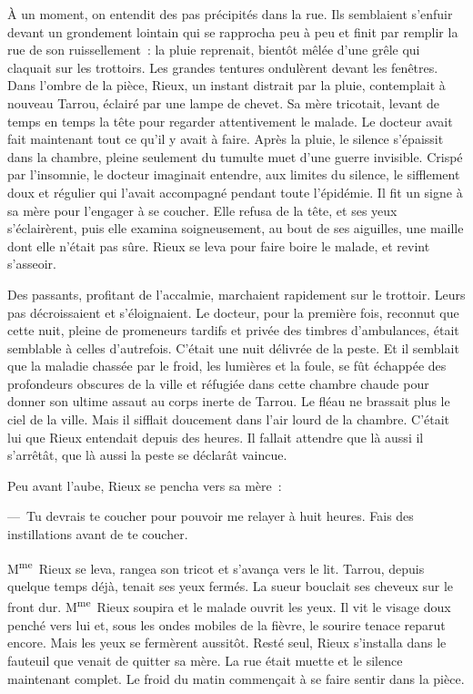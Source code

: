 \documentclass[french,twoside]{book} %
\begin{document}
À un moment, on entendit des pas précipités dans la rue. Ils semblaient s’enfuir devant un grondement lointain qui se rapprocha peu à peu et finit par remplir la rue de son ruissellement : la pluie reprenait, bientôt mêlée d’une grêle qui claquait sur les trottoirs. Les grandes tentures ondulèrent devant les fenêtres. Dans l’ombre de la pièce, Rieux, un instant distrait par la pluie, contemplait à nouveau Tarrou, éclairé par une lampe de chevet. Sa mère tricotait, levant de temps en temps la tête pour regarder attentivement le malade. Le docteur avait fait maintenant tout ce qu’il y avait à faire. Après la pluie, le silence s’épaissit dans la chambre, pleine seulement du tumulte muet d’une guerre invisible. Crispé par l’insomnie, le docteur imaginait entendre, aux limites du silence, le sifflement doux et régulier qui l’avait accompagné pendant toute l’épidémie. Il fit un signe à sa mère pour l’engager à se coucher. Elle refusa de la tête, et ses yeux s’éclairèrent, puis elle examina soigneusement, au bout de ses aiguilles, une maille dont elle n’était pas sûre. Rieux se leva pour faire boire le malade, et revint s’asseoir.\par
Des passants, profitant de l’accalmie, marchaient rapidement sur le trottoir. Leurs pas décroissaient et s’éloignaient. Le docteur, pour la première fois, reconnut que cette nuit, pleine de promeneurs tardifs et privée des timbres d’ambulances, était semblable à celles d’autrefois. C’était une nuit délivrée de la peste. Et il semblait que la maladie chassée par le froid, les lumières et la foule, se fût échappée des profondeurs obscures de la ville et réfugiée dans cette chambre chaude pour donner son ultime assaut au corps inerte de Tarrou. Le fléau ne brassait plus le ciel de la ville. Mais il sifflait doucement dans l’air lourd de la chambre. C’était lui que Rieux entendait depuis des heures. Il fallait attendre que là aussi il s’arrêtât, que là aussi la peste se déclarât vaincue.\par
Peu avant l’aube, Rieux se pencha vers sa mère :\par
— Tu devrais te coucher pour pouvoir me relayer à huit heures. Fais des instillations avant de te coucher.\par
M\textsuperscript{me} Rieux se leva, rangea son tricot et s’avança vers le lit. Tarrou, depuis quelque temps déjà, tenait ses yeux fermés. La sueur bouclait ses cheveux sur le front dur. M\textsuperscript{me} Rieux soupira et le malade ouvrit les yeux. Il vit le visage doux penché vers lui et, sous les ondes mobiles de la fièvre, le sourire tenace reparut encore. Mais les yeux se fermèrent aussitôt. Resté seul, Rieux s’installa dans le fauteuil que venait de quitter sa mère. La rue était muette et le silence maintenant complet. Le froid du matin commençait à se faire sentir dans la pièce.\par
\end{document}
